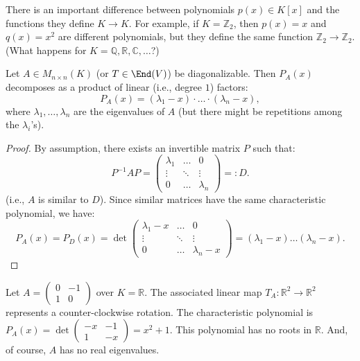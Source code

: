 \begin{importantremark}\label{rem:poly_vs_func}
  There is an important difference between polynomials $p(x) \in K[x]$ and the functions they define $K \rightarrow K$.
  For example, if $K = \mathbb{Z}_2$, then $p(x) = x$ and $q(x) = x^2$ are different polynomials, but they define the same function $\mathbb{Z}_2 \rightarrow \mathbb{Z}_2$. (What happens for $K = \mathbb{Q}, \mathbb{R}, \mathbb{C}, \dots$?)
\end{importantremark}

\begin{lemma} \label{lem:diag_decomp}
  Let $A \in M_{n \times n}(K)$ (or $T \in \End(V)$) be diagonalizable. Then $P_A(x)$ decomposes as a product of linear (i.e., degree $1$) factors:
  \[ P_A(x) = (\lambda_1 - x) \cdot \dots \cdot (\lambda_n - x), \]
  where $\lambda_1, \dots, \lambda_n$ are the eigenvalues of $A$ (but there might be repetitions among the $\lambda_i$'s).
\end{lemma}

\begin{proof}
  By assumption, there exists an invertible matrix $P$ such that:
  \begin{equation} \label{eq:diagonal_similarity}
    P^{-1}AP = \begin{pmatrix} \lambda_1 & \dots & 0 \\ \vdots & \ddots & \vdots \\ 0 & \dots & \lambda_n \end{pmatrix} =: D.
  \end{equation}
  (i.e., $A$ is similar to $D$).
  Since similar matrices have the same characteristic polynomial, we have:
  \[ P_A(x) = P_D(x) = \det \begin{pmatrix} \lambda_1 - x & \dots & 0 \\ \vdots & \ddots & \vdots \\ 0 & \dots & \lambda_n - x \end{pmatrix} = (\lambda_1 - x) \dots (\lambda_n - x). \]
\end{proof}

\begin{example}\label{ex:no_real_eigenvalues}
  Let $A = \left(\begin{smallmatrix} 0 & -1 \\ 1 & 0 \end{smallmatrix}\right)$ over $K = \mathbb{R}$. The associated linear map $T_A : \mathbb{R}^2 \rightarrow \mathbb{R}^2$ represents a counter-clockwise rotation.
  The characteristic polynomial is $P_A(x) = \det\left(\begin{smallmatrix} -x & -1 \\ 1 & -x \end{smallmatrix}\right) = x^2 + 1$.
  This polynomial has no roots in $\mathbb{R}$. And, of course, $A$ has no real eigenvalues.
\end{example}

